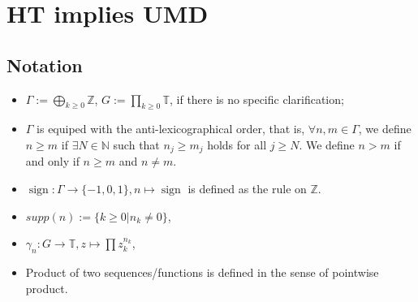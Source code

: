 \section{HT implies UMD }\label{sec-HT to UMD}

\subsection{Notation}
\begin{itemize}
    \item $\Gamma:=\bigoplus_{k\geq0}\mathbb{Z}$, $G:=\prod_{k\geq0}\mathbb{T}$, if there is no specific clarification;
    \item $\Gamma$ is equiped with the anti-lexicographical order, that is, $\forall n,m\in\Gamma$, we define $n\geq m$ if $\exists N\in \mathbb{N}$ such that $n_j\geq m_j$ holds for all $j\geq N$. We define $n>m$ if and only if $n\geq m$ and $n\ne m$.
    \item $\operatorname{sign}\colon\Gamma\to\{-1,0,1\},n\mapsto\operatorname{sign}$ is defined as the rule on $\mathbb{Z}$.
    \item  $supp(n):=\{k\geq0| n_k\ne0\}$,
    \item $\gamma_n\colon G\to \mathbb{T}, z\mapsto \prod z_k^{n_k}$,
    \item Product of two sequences/functions is defined in the sense of pointwise product. 
\end{itemize}


